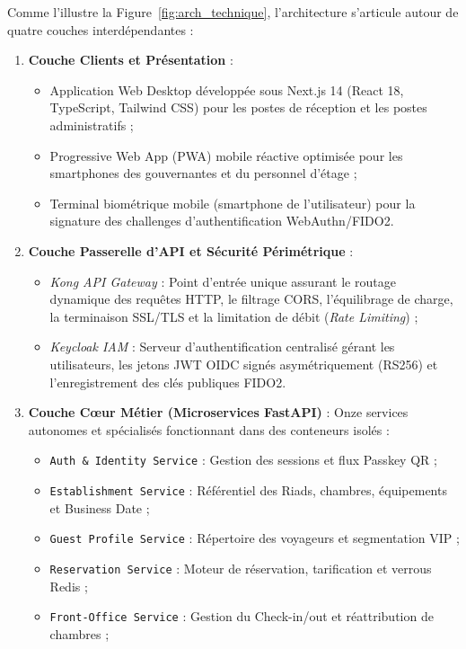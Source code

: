 Comme l'illustre la Figure~\ref{fig:arch_technique}, l'architecture s'articule autour de quatre couches interdépendantes :
\begin{enumerate}
    \item \textbf{Couche Clients et Présentation} : 
    \begin{itemize}
        \item Application Web Desktop développée sous Next.js 14 (React 18, TypeScript, Tailwind CSS) pour les postes de réception et les postes administratifs ;
        \item Progressive Web App (PWA) mobile réactive optimisée pour les smartphones des gouvernantes et du personnel d'étage ;
        \item Terminal biométrique mobile (smartphone de l'utilisateur) pour la signature des challenges d'authentification WebAuthn/FIDO2.
    \end{itemize}
    \item \textbf{Couche Passerelle d'API et Sécurité Périmétrique} :
    \begin{itemize}
        \item \textit{Kong API Gateway} : Point d'entrée unique assurant le routage dynamique des requêtes HTTP, le filtrage CORS, l'équilibrage de charge, la terminaison SSL/TLS et la limitation de débit (\textit{Rate Limiting}) ;
        \item \textit{Keycloak IAM} : Serveur d'authentification centralisé gérant les utilisateurs, les jetons JWT OIDC signés asymétriquement (RS256) et l'enregistrement des clés publiques FIDO2.
    \end{itemize}
    \item \textbf{Couche Cœur Métier (Microservices FastAPI)} : Onze services autonomes et spécialisés fonctionnant dans des conteneurs isolés :
    \begin{itemize}
        \item \texttt{Auth \& Identity Service} : Gestion des sessions et flux Passkey QR ;
        \item \texttt{Establishment Service} : Référentiel des Riads, chambres, équipements et Business Date ;
        \item \texttt{Guest Profile Service} : Répertoire des voyageurs et segmentation VIP ;
        \item \texttt{Reservation Service} : Moteur de réservation, tarification et verrous Redis ;
        \item \texttt{Front-Office Service} : Gestion du Check-in/out et réattribution de chambres ;

\end{itemize}
\end{enumerate}
